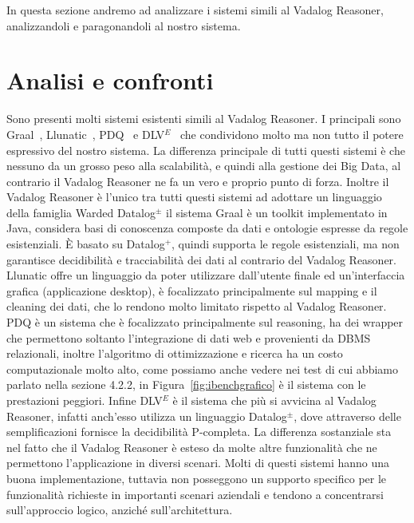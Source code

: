 In questa sezione andremo ad analizzare i sistemi simili al Vadalog Reasoner, analizzandoli e paragonandoli al nostro sistema. \newline

\section{Analisi e confronti}

Sono presenti molti sistemi esistenti simili al Vadalog Reasoner. I principali sono Graal~\cite{baget2015graal}, Llunatic~\cite{geerts2014s}, PDQ~\cite{benedikt2015querying} e DLV$^E$~\cite{leone2012efficiently} che condividono molto ma non tutto il potere espressivo del nostro sistema. \newline
La differenza principale di tutti questi sistemi è che nessuno da un grosso peso alla scalabilità, e quindi alla gestione dei Big Data, al contrario il Vadalog Reasoner ne fa un vero e proprio punto di forza. Inoltre il Vadalog Reasoner è l'unico tra tutti questi sistemi ad adottare un linguaggio della famiglia Warded Datalog$^\pm$\newline \newline
il sistema Graal è un toolkit implementato in Java, considera basi di conoscenza composte da dati e ontologie espresse da regole esistenziali. È basato su Datalog$^+$, quindi supporta le regole esistenziali, ma non garantisce decidibilità e tracciabilità dei dati al contrario del Vadalog Reasoner. \newline \newline
Llunatic offre un linguaggio da poter utilizzare dall'utente finale ed un'interfaccia grafica (applicazione desktop), è focalizzato principalmente sul mapping e il cleaning dei dati, che lo rendono molto limitato rispetto al Vadalog Reasoner. \newline \newline
PDQ è un sistema che è focalizzato principalmente sul reasoning, ha dei wrapper che permettono soltanto l'integrazione di dati web e provenienti da DBMS relazionali, inoltre l'algoritmo di ottimizzazione e ricerca ha un costo computazionale molto alto, come possiamo anche vedere nei test di cui abbiamo parlato nella sezione 4.2.2, in Figura~\ref{fig:ibenchgrafico} è il sistema con le prestazioni peggiori. \newline \newline
Infine DLV$^E$ è il sistema che più si avvicina al Vadalog Reasoner, infatti anch'esso utilizza un linguaggio Datalog$^\pm$, dove attraverso delle semplificazioni fornisce la decidibilità P-completa. La differenza sostanziale sta nel fatto che il Vadalog Reasoner è esteso da molte altre funzionalità che ne permettono l'applicazione in diversi scenari. \newline \newline
Molti di questi sistemi hanno una buona implementazione, tuttavia non posseggono un supporto specifico per le funzionalità richieste in importanti scenari aziendali e tendono a concentrarsi sull'approccio logico, anziché sull'architettura.


